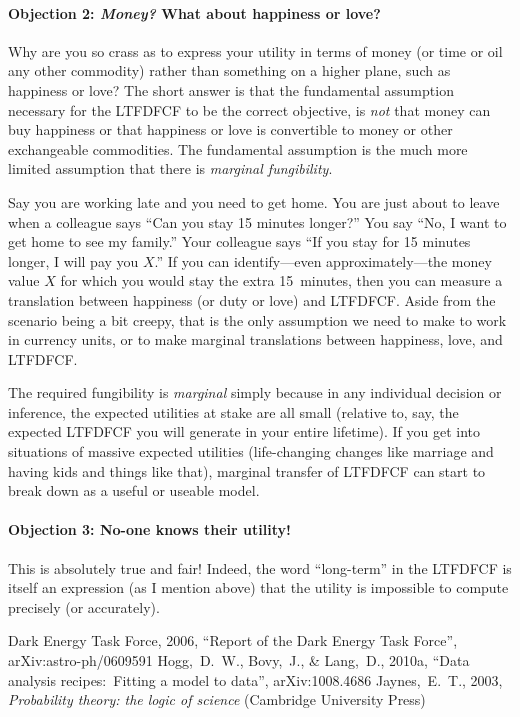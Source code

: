 \documentclass[12pt,twoside,pdftex]{article}
\begin{document}
\paragraph{Objection 2: \emph{Money?} What about happiness or love?}
Why are you so crass as to express your utility in terms of money (or
time or oil any other commodity) rather than something on a higher
plane, such as happiness or love?  The short answer is that the
fundamental assumption necessary for the LTFDFCF to be the correct
objective, is \emph{not} that money can buy happiness or that
happiness or love is convertible to money or other exchangeable
commodities.  The fundamental assumption is the much more limited
assumption that there is \emph{marginal fungibility}.

Say you are working late and you need to get home.  You are just about
to leave when a colleague says ``Can you stay 15 minutes longer?''
You say ``No, I want to get home to see my family.''  Your colleague
says ``If you stay for 15 minutes longer, I will pay you $X$.''  If
you can identify---even approximately---the money value $X$ for which
you would stay the extra 15~minutes, then you can measure a
translation between happiness (or duty or love) and LTFDFCF.  Aside
from the scenario being a bit creepy, that is the only assumption we
need to make to work in currency units, or to make marginal
translations between happiness, love, and LTFDFCF.

The required fungibility is \emph{marginal} simply because in any
individual decision or inference, the expected utilities at stake are
all small (relative to, say, the expected LTFDFCF you will generate in
your entire lifetime).  If you get into situations of massive expected
utilities (life-changing changes like marriage and having kids and
things like that), marginal transfer of LTFDFCF can start to break
down as a useful or useable model.

\paragraph{Objection 3: No-one knows their utility!}
This is absolutely true and fair!  Indeed, the word ``long-term'' in
the LTFDFCF is itself an expression (as I mention above) that the
utility is impossible to compute precisely (or accurately).

\clearpage
{}\theendnotes

\clearpage
\begin{thebibliography}{}\raggedright
{}
  Dark Energy Task Force, 2006,
  ``Report of the Dark Energy Task Force'', arXiv:astro-ph/0609591
  Hogg,~D.~W., Bovy,~J., \& Lang,~D., 2010a,
  ``Data analysis recipes:\ Fitting a model to data'', arXiv:1008.4686
  Jaynes,~E.~T., 2003,
  \textit{Probability theory: the logic of science} (Cambridge University Press)
\end{thebibliography}
\end{document}

